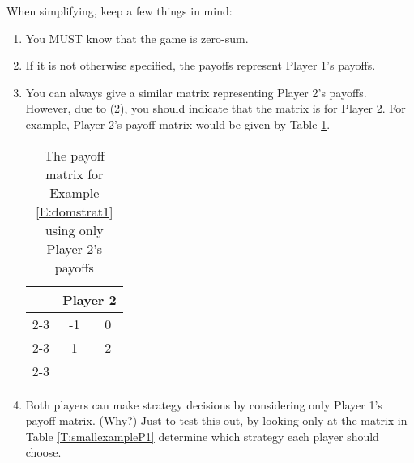 When simplifying, keep a few things in mind:
\begin{enumerate}
\item You MUST know that the game is zero-sum.
\item If it is not otherwise specified, the payoffs represent Player 1's payoffs.
\item You can always give a similar matrix representing Player 2's payoffs. However, due to (2), you should indicate that the matrix is for Player 2. For example, Player 2's payoff matrix would be given by Table \ref{T:smallexampleP2}.




\begin{table}[h]
\centering

\begin{tabular}{ccc}
                      & \multicolumn{2}{c}{Player 2}                                                  \\ \cline{2-3} 
\multicolumn{1}{l|}{Player 1}  & \multicolumn{1}{c|}{-1} & \multicolumn{1}{c|}{0} \\ \cline{2-3} 
\multicolumn{1}{l|}{}  & \multicolumn{1}{c|}{1} & \multicolumn{1}{c|}{2} \\ \cline{2-3} 
\end{tabular}
\caption{The payoff matrix for Example \ref{E:domstrat1} using only Player 2's payoffs}
\label{T:smallexampleP2}
\end{table}



\item Both players can make strategy decisions by considering only Player 1's payoff matrix. (Why?) Just to test this out, by looking only at the matrix in Table \ref{T:smallexampleP1} determine which strategy each player should choose.




\end{enumerate}
